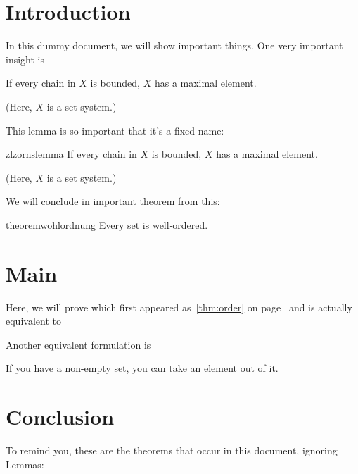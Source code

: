\documentclass{article}
\begin{document}
  \section{Introduction}
  
  In this dummy document, we will show important things. One very important
  insight is
  \begin{lemma}[Zorn]
    If every chain in $X$ is bounded, $X$ has a maximal element.
    
    (Here, $X$ is a set system.)
  \end{lemma}
  
  This lemma is so important that it's a fixed name:
  \begin{restatable}{zl}{zornslemma}
    If every chain in $X$ is bounded, $X$ has a maximal element.
    
    (Here, $X$ is a set system.)
  \end{restatable}
  
  We will conclude in important theorem from this:
  \begin{restatable}{theorem}{wohlordnung}\label{thm:order}
    Every set is well-ordered.
  \end{restatable}
  

  \section{Main}
  
  Here, we will prove \wohlordnung which first appeared
  as~\autoref{thm:order} on page~\pageref{thm:order} and is 
  actually equivalent to
  \zornslemma
  
  Another equivalent formulation is
  \begin{axiom}
    If you have a non-empty set, you can take an element out of it.
  \end{axiom}
  
  \section{Conclusion}
  
  To remind you, these are the theorems that occur in this document,
  ignoring Lemmas:
  
  \listoftheorems
  
\end{document}
